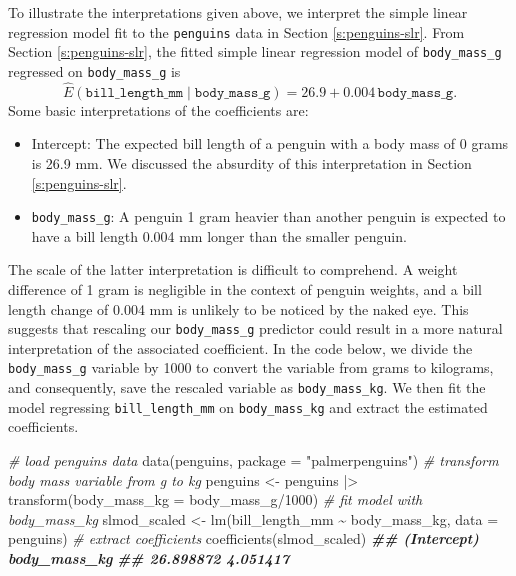 \documentclass[
]{book}
\newenvironment{Shaded}{\begin{snugshade}}{\end{snugshade}}
\newcommand{\AttributeTok}[1]{\textcolor[rgb]{0.77,0.63,0.00}{#1}}
\newcommand{\CommentTok}[1]{\textcolor[rgb]{0.56,0.35,0.01}{\textit{#1}}}
\newcommand{\DecValTok}[1]{\textcolor[rgb]{0.00,0.00,0.81}{#1}}
\newcommand{\DocumentationTok}[1]{\textcolor[rgb]{0.56,0.35,0.01}{\textbf{\textit{#1}}}}
\newcommand{\FunctionTok}[1]{\textcolor[rgb]{0.00,0.00,0.00}{#1}}
\newcommand{\NormalTok}[1]{#1}
\newcommand{\OtherTok}[1]{\textcolor[rgb]{0.56,0.35,0.01}{#1}}
\newcommand{\SpecialCharTok}[1]{\textcolor[rgb]{0.00,0.00,0.00}{#1}}
\newcommand{\StringTok}[1]{\textcolor[rgb]{0.31,0.60,0.02}{#1}}
\providecommand{\tightlist}{%
  \setlength{\itemsep}{0pt}\setlength{\parskip}{0pt}}
\theoremstyle{definition}
\theoremstyle{definition}
\theoremstyle{definition}
\theoremstyle{definition}
\theoremstyle{remark}
\begin{document}
To illustrate the interpretations given above, we interpret the simple
linear regression model fit to the \texttt{penguins} data in Section
\ref{s:penguins-slr}. From Section \ref{s:penguins-slr}, the fitted
simple linear regression model of \texttt{body\_mass\_g} regressed on
\texttt{body\_mass\_g} is \[
\hat{E}(\mathtt{bill\_length\_mm}\mid \mathtt{body\_mass\_g})=26.9+0.004 \label{eq:slr-penguin-orig} \,\mathtt{body\_mass\_g}.
\] Some basic interpretations of the coefficients are:

\begin{itemize}
\tightlist
\item
  Intercept: The expected bill length of a penguin with a body mass of
  0 grams is 26.9 mm. We discussed the absurdity of this
  interpretation in Section \ref{s:penguins-slr}.
\item
  \texttt{body\_mass\_g}: A penguin 1 gram heavier than another penguin is
  expected to have a bill length 0.004 mm longer than the smaller
  penguin.
\end{itemize}

The scale of the latter interpretation is difficult to comprehend. A
weight difference of 1 gram is negligible in the context of penguin
weights, and a bill length change of 0.004 mm is unlikely to be noticed
by the naked eye. This suggests that rescaling our \texttt{body\_mass\_g}
predictor could result in a more natural interpretation of the
associated coefficient. In the code below, we divide the \texttt{body\_mass\_g}
variable by 1000 to convert the variable from grams to kilograms, and
consequently, save the rescaled variable as \texttt{body\_mass\_kg}. We then fit
the model regressing \texttt{bill\_length\_mm} on \texttt{body\_mass\_kg} and extract the
estimated coefficients.

\begin{Shaded}
\begin{Highlighting}[]
\CommentTok{\# load penguins data}
\FunctionTok{data}\NormalTok{(penguins, }\AttributeTok{package =} \StringTok{"palmerpenguins"}\NormalTok{)}
\CommentTok{\# transform body mass variable from g to kg}
\NormalTok{penguins }\OtherTok{\textless{}{-}}\NormalTok{ penguins }\SpecialCharTok{|\textgreater{}} \FunctionTok{transform}\NormalTok{(}\AttributeTok{body\_mass\_kg =}\NormalTok{ body\_mass\_g}\SpecialCharTok{/}\DecValTok{1000}\NormalTok{)}
\CommentTok{\# fit model with body\_mass\_kg}
\NormalTok{slmod\_scaled }\OtherTok{\textless{}{-}} \FunctionTok{lm}\NormalTok{(bill\_length\_mm }\SpecialCharTok{\textasciitilde{}}\NormalTok{ body\_mass\_kg, }\AttributeTok{data =}\NormalTok{ penguins)}
\CommentTok{\# extract coefficients}
\FunctionTok{coefficients}\NormalTok{(slmod\_scaled)}
\DocumentationTok{\#\#  (Intercept) body\_mass\_kg }
\DocumentationTok{\#\#    26.898872     4.051417}
\end{Highlighting}
\end{Shaded}
\end{document}
